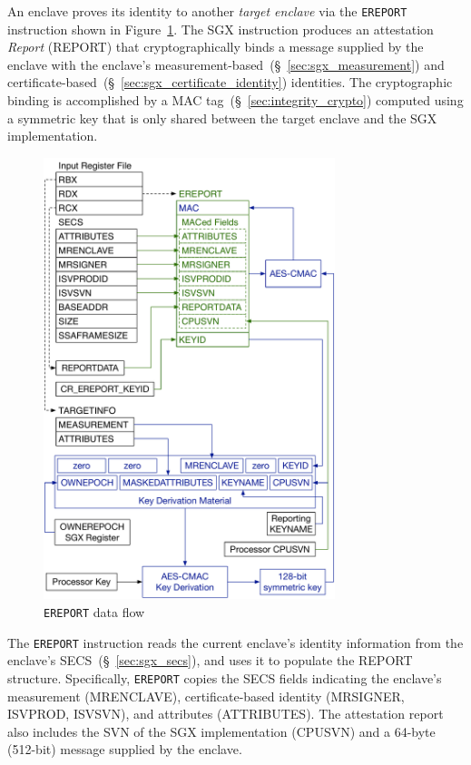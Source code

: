 \label{sec:sgx_ereport}


An enclave proves its identity to another \textit{target enclave} via the
\texttt{EREPORT} instruction shown in Figure~\ref{fig:sgx_ereport}. The SGX
instruction produces an attestation \textit{Report} (REPORT) that
cryptographically binds a message supplied by the enclave with the enclave's
measurement-based~(\S~\ref{sec:sgx_measurement}) and
certificate-based~(\S~\ref{sec:sgx_certificate_identity}) identities. The
cryptographic binding is accomplished by a MAC
tag~(\S~\ref{sec:integrity_crypto}) computed using a symmetric key that is only
shared between the target enclave and the SGX implementation.

\begin{figure}[hbt]
  \centering
  \includegraphics[width=85mm]{figures/sgx_ereport.pdf}
  \caption{
    \texttt{EREPORT} data flow
  }
  \label{fig:sgx_ereport}
\end{figure}

The \texttt{EREPORT} instruction reads the current enclave's identity
information from the enclave's SECS~(\S~\ref{sec:sgx_secs}), and uses it to
populate the REPORT structure. Specifically, \texttt{EREPORT} copies the
SECS fields indicating the enclave's measurement (MRENCLAVE), certificate-based
identity (MRSIGNER, ISVPROD, ISVSVN), and attributes (ATTRIBUTES). The
attestation report also includes the SVN of the SGX implementation (CPUSVN)
and a 64-byte (512-bit) message supplied by the enclave.

